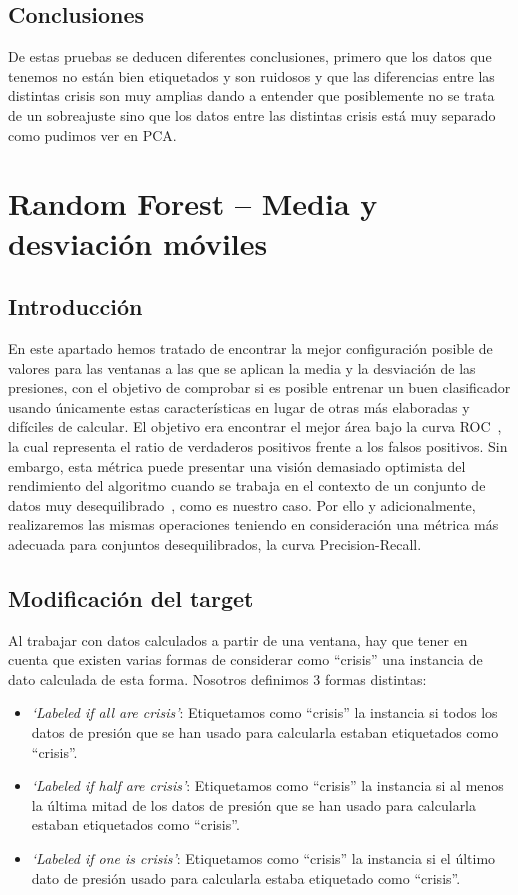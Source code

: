 \documentclass[a4paper,12pt,twoside,oldfontcommands]{memoir}
\begin{document}
\section{Conclusiones}
De estas pruebas se deducen diferentes conclusiones, primero que los datos que tenemos no están bien etiquetados y son ruidosos y que las diferencias entre las distintas crisis son muy amplias dando a entender que posiblemente no se trata de un sobreajuste sino que los datos entre las distintas crisis está muy separado como pudimos ver en PCA.


\chapter{Random Forest -- Media y desviación móviles} 
\section{Introducción}
En este apartado hemos tratado de encontrar la mejor configuración posible de valores para las ventanas a las que se aplican la media y la desviación de las presiones, con el objetivo de comprobar si es posible entrenar un buen clasificador usando únicamente estas características en lugar de otras más elaboradas y difíciles de calcular. El objetivo era encontrar el mejor área bajo la curva ROC~\cite{galar2012review}, la cual representa el ratio de verdaderos positivos frente a los falsos positivos. Sin embargo, esta métrica puede presentar una visión demasiado optimista del rendimiento del algoritmo cuando se trabaja en el contexto de un conjunto de datos muy desequilibrado~\cite{Davis2006RPR, saito2015pr}, como es nuestro caso. Por ello y adicionalmente, realizaremos las mismas operaciones teniendo en consideración una métrica más adecuada para conjuntos desequilibrados, la curva Precision-Recall. 

\section{Modificación del target}
Al trabajar con datos calculados a partir de una ventana, hay que tener en cuenta que existen varias formas de considerar como ``crisis'' una instancia de dato calculada de esta forma. Nosotros definimos 3 formas distintas: 

\begin{itemize}
    \item \textit{`Labeled if all are crisis'}: Etiquetamos como ``crisis'' la instancia si todos los datos de presión que se han usado para calcularla estaban etiquetados como ``crisis''. 
    \item \textit{`Labeled if half are crisis'}: Etiquetamos como ``crisis'' la instancia si al menos la última mitad de los datos de presión que se han usado para calcularla estaban etiquetados como ``crisis''. 
    \item \textit{`Labeled if one is crisis'}: Etiquetamos como ``crisis'' la instancia si el último dato de presión usado para calcularla estaba etiquetado como ``crisis''. 
\end{itemize}
\end{document}

